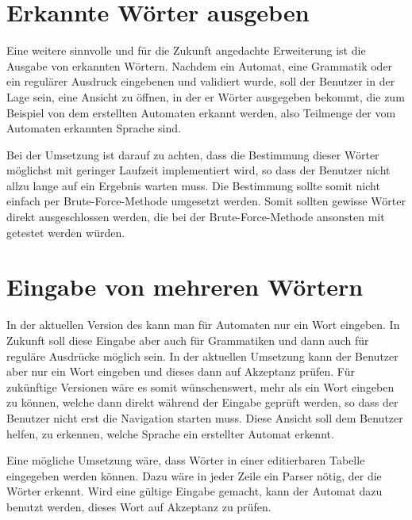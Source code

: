 \section{Erkannte Wörter ausgeben}\label{PerspectiveDetectedWords}

Eine weitere sinnvolle und für die Zukunft angedachte Erweiterung ist die Ausgabe
von erkannten Wörtern. Nachdem ein Automat, eine Grammatik oder ein regulärer
Ausdruck eingebenen und validiert wurde, soll der Benutzer in der Lage sein, eine
Ansicht zu öffnen, in der er Wörter ausgegeben bekommt, die zum Beispiel von dem
erstellten Automaten erkannt werden, also Teilmenge der vom Automaten erkannten
Sprache sind.\vspace{10pt}

Bei der Umsetzung ist darauf zu achten, dass die Bestimmung dieser Wörter
möglichst mit geringer Laufzeit implementiert wird, so dass der Benutzer nicht
allzu lange auf ein Ergebnis warten muss. Die Bestimmung sollte somit nicht
einfach per Brute-Force-Methode umgesetzt werden. Somit sollten gewisse Wörter
direkt ausgeschlossen werden, die bei der Brute-Force-Methode ansonsten mit
getestet werden würden.\vspace{10pt}


\section{Eingabe von mehreren Wörtern}\label{PerspectiveMultiplyWordInput}

In der aktuellen Version des \gtitools kann man für Automaten nur ein Wort
eingeben. In Zukunft soll diese Eingabe aber auch für Grammatiken und dann auch
für reguläre Ausdrücke möglich sein. In der aktuellen Umsetzung kann der Benutzer
aber nur ein Wort eingeben und dieses dann auf Akzeptanz prüfen. Für zukünftige
Versionen wäre es somit wünschenswert, mehr als ein Wort eingeben zu können,
welche dann direkt während der Eingabe geprüft werden, so dass der Benutzer
nicht erst die Navigation starten muss. Diese Ansicht soll dem Benutzer helfen,
zu erkennen, welche Sprache ein erstellter Automat erkennt.\vspace{10pt}

Eine mögliche Umsetzung wäre, dass Wörter in einer editierbaren Tabelle
eingegeben werden können. Dazu wäre in jeder Zeile ein Parser nötig, der die
Wörter erkennt. Wird eine gültige Eingabe gemacht, kann der Automat dazu
benutzt werden, dieses Wort auf Akzeptanz zu prüfen.\vspace{10pt}


